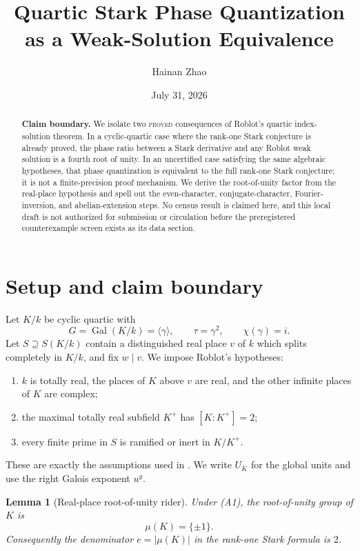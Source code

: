 \documentclass[11pt]{article}
\title{Quartic Stark Phase Quantization as a Weak-Solution Equivalence}
\author{Hainan Zhao}
\date{July 31, 2026}
\newtheorem{lemma}[theorem]{Lemma}
\newcommand{\Gal}{\operatorname{Gal}}
\newcommand{\muK}{\mu(K)}
\begin{document}
\maketitle

\begin{abstract}
\noindent\textbf{Claim boundary.}
We isolate two \textsc{proved} consequences of Roblot's quartic
index-solution theorem.  In a cyclic-quartic case where the rank-one
Stark conjecture is already proved, the phase ratio between a Stark
derivative and any Roblot weak solution is a fourth root of unity.  In
an uncertified case satisfying the same algebraic hypotheses, that
phase quantization is equivalent to the full rank-one Stark
conjecture; it is not a finite-precision proof mechanism.  We derive
the root-of-unity factor from the real-place hypothesis and spell out
the even-character, conjugate-character, Fourier-inversion, and
abelian-extension steps.  No census result is claimed here, and this
local draft is not authorized for submission or circulation before
the preregistered counterexample screen exists as its data section.
\end{abstract}

\section{Setup and claim boundary}

Let \(K/k\) be cyclic quartic with
\[
G=\Gal(K/k)=\langle\gamma\rangle,\qquad
\tau=\gamma^2,\qquad \chi(\gamma)=i.
\]
Let \(S\supseteq S(K/k)\) contain a distinguished real place \(v\) of
\(k\) which splits completely in \(K/k\), and fix \(w\mid v\).
We impose Roblot's hypotheses:
\begin{enumerate}
\item[(A1)] \(k\) is totally real, the places of \(K\) above \(v\) are
  real, and the other infinite places of \(K\) are complex;
\item[(A2)] the maximal totally real subfield \(K^+\) has
  \([K:K^+]=2\);
\item[(A3)] every finite prime in \(S\) is ramified or inert in
  \(K/K^+\).
\end{enumerate}
These are exactly the assumptions used in
\cite[pp.~392--393]{Roblot2013}.  We write \(U_K\) for the global
units and use the right Galois exponent \(u^g\).

\begin{lemma}[Real-place root-of-unity rider]\label{lem:roots}
Under \emph{(A1)}, the root-of-unity group of \(K\) is
\[
\muK=\{\pm1\}.
\]
Consequently the denominator \(e=|\muK|\) in the rank-one Stark
formula is \(2\).
\end{lemma}
\end{document}

